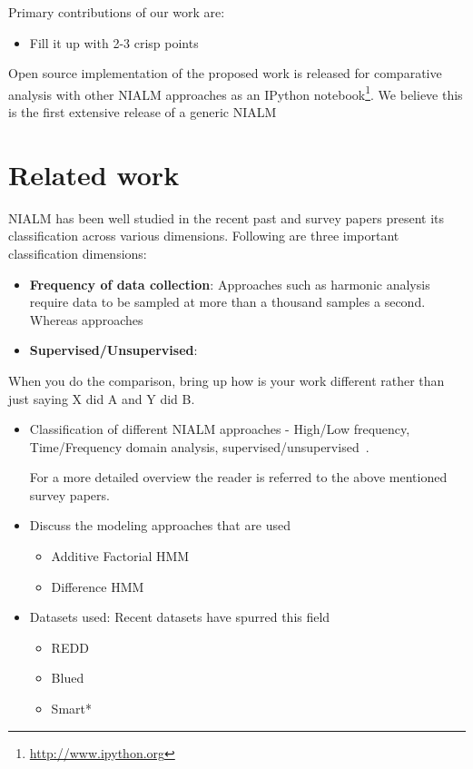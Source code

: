 \documentclass[conference]{IEEEtran}
\begin{document}
Primary contributions of our work are:
\begin{itemize}
\item Fill it up with 2-3 crisp points
\end{itemize}
Open source implementation of the proposed work is released for comparative analysis with other NIALM approaches as an IPython notebook\footnote{\url{http://www.ipython.org}}. We believe this is the first extensive release of a generic NIALM

\section{Related work}
NIALM has been well studied in the recent past and survey papers \cite{survey1,survey2,survey3} present its classification across various dimensions. Following are three important classification dimensions:
\begin{itemize}
\item \textbf{Frequency of data collection}: Approaches such as harmonic analysis require data to be sampled at more than a thousand samples a second. Whereas approaches 
\item \textbf{Supervised/Unsupervised}: 
\end{itemize}
When you do the comparison, bring up how is your work different rather than just saying X did A and Y did B.
\begin{itemize}
\item Classification of different NIALM approaches - High/Low frequency, Time/Frequency domain analysis, supervised/unsupervised~\cite{survey1,survey2,survey3}.

For a more detailed overview the reader is referred to the above mentioned survey papers.

\item Discuss the modeling approaches that are used
\begin{itemize}
\item Additive Factorial HMM
\item Difference HMM \cite{parson2012_aaai}
\end{itemize}

\item Datasets used: Recent datasets have spurred this field
\begin{itemize}
\item REDD \cite{redd}
\item Blued \cite{blued_cmu}
\item Smart* \cite{smart}
\end{itemize}

\end{itemize}
\end{document}
